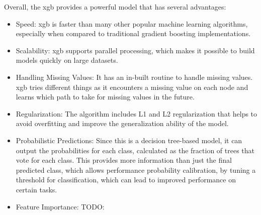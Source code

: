 Overall, the \ac{xgb} provides a powerful model that has several advantages:

\begin{itemize}
	\item Speed: \ac{xgb} is faster than many other popular machine learning algorithms, especially when compared to traditional gradient boosting implementations.
	
	\item Scalability: \ac{xgb} supports parallel processing, which makes it possible to build models quickly on large datasets.
	
	\item Handling Missing Values: It has an in-built routine to handle missing values. \ac{xgb} tries different things as it encounters a missing value on each node and learns which path to take for missing values in the future.
	
	\item Regularization: The algorithm includes L1 and L2 regularization that helps to avoid overfitting and improve the generalization ability of the model.
	
	\item Probabilistic Predictions: Since this is a decision tree-based model, it can output the probabilities for each class, calculated as the fraction of trees that vote for each class. This provides more information than just the final predicted class, which allows performance probability calibration, by tuning a threshold for classification, which can lead to improved performance on certain tasks.
	
	\item Feature Importance: TODO:
\end{itemize}
